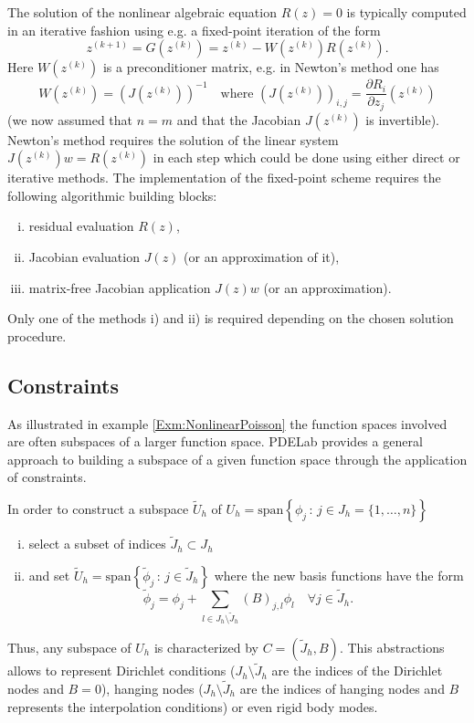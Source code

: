 \documentclass[a4paper,12pt]{article}
\theoremstyle{definition}
\begin{document}
The solution of the nonlinear algebraic equation $R(z)=0$ is typically computed
in an iterative fashion using e.g. a fixed-point iteration of the form
\begin{equation}
z^{(k+1)} = G(z^{(k)}) = z^{(k)} - W(z^{(k)}) R(z^{(k)}) .
\end{equation}
Here $W(z^{(k)})$ is a preconditioner matrix, e.g. in Newton's method one
has 
\begin{equation*}
W(z^{(k)}) = (J(z^{(k)}))^{-1} \quad \text{where $(J(z^{(k)}))_{i,j} = \frac{\partial R_i}{\partial z_j}
(z^{(k)})$}
\end{equation*}
(we now assumed that $n=m$ and that the Jacobian $J(z^{(k)})$ is invertible).
Newton's method requires the solution of the linear system $J(z^{(k)}) w = R(z^{(k)})$ in each
step which could be done using either direct or iterative methods.
The implementation of the fixed-point scheme requires the following
algorithmic building blocks:
\begin{enumerate}[i)]
\item residual evaluation $R(z)$,
\item Jacobian evaluation $J(z)$ (or an approximation of it),
\item matrix-free Jacobian application $J(z) w$ (or an approximation).
\end{enumerate}
Only one of the methods i) and ii) is required depending on the chosen
solution procedure.

\subsection*{Constraints}

As illustrated in example \ref{Exm:NonlinearPoisson} the function spaces
involved are often subspaces of a larger function space. PDELab provides
a general approach to building a subspace of a given function space through
the application of constraints. 

In order to construct a subspace $\tilde{U}_h$ 
of $U_h = \text{span}\left\{\phi_j \,:\, j\in J_h=\{1,\ldots,n\}\right\}$ 
\begin{enumerate}[i)]
\item select a subset of indices $\tilde{J}_h\subset J_h$
\item and set $\tilde{U}_h = \text{span}\left\{\tilde\phi_j \,:\, j\in \tilde{J}_h\right\}$ 
where the new basis functions have the form 
\begin{equation*}
\tilde\phi_j = \phi_j + \sum_{l\in J_h\setminus\tilde{J}_h} (B)_{j,l} \phi_l \quad \forall j\in \tilde{J}_h.
\end{equation*}
\end{enumerate}
Thus, any subspace of $U_h$ is characterized by $C=(\tilde{J}_h,B)$.
This abstractions allows to represent Dirichlet conditions ($J_h\setminus\tilde{J}_h$
are the indices of the Dirichlet nodes and $B=0$), hanging nodes
($J_h\setminus\tilde{J}_h$ are the indices of hanging nodes and $B$ represents
the interpolation conditions) or even rigid body modes.
\end{document}

